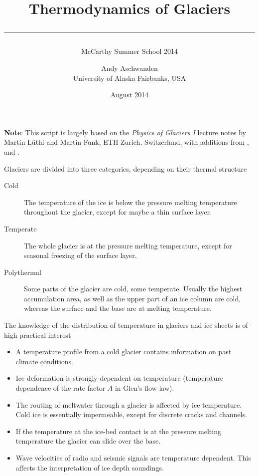\documentclass[parskip=half]{scrartcl}
\begin{document}
\title{Thermodynamics of Glaciers\\[.5em]
\rule[1.em]{\textwidth}{2pt}}
\subtitle{McCarthy Summer School 2014}

\date{August 2014}

\author{
  \small Andy Aschwanden\\[-.5em] 
 \small University of Alaska Fairbanks, USA}


\maketitle

{\bf Note}: This script is largely based on the \emph{Physics of
Glaciers I} lecture notes by Martin L\"uthi and Martin Funk, ETH
Zurich, Switzerland, with additions from \cite{GreveBlatter_disg},
\cite{Gusmeroli2010} and \cite{Aschwanden2012}.

\vspace{1em}

Glaciers are divided into three categories, depending on their thermal
structure
%
\begin{description}
\item[Cold] The temperature of the ice is below the pressure melting
temperature throughout the glacier, except for maybe a thin surface
layer.
\item[Temperate] The whole glacier is at the pressure melting
temperature, except for seasonal freezing of the surface layer.
\item[Polythermal] Some parts of the glacier are cold, some temperate.
Usually the highest accumulation area, as well as the upper part of an
ice column are cold, whereas the surface and the base are at melting
temperature.
\end{description}
%
The knowledge of the distribution of temperature in glaciers and ice
sheets is of high practical interest
%
\begin{itemize}\itemsep0ex
\item A temperature profile from a cold glacier contains information
on past climate conditions.
\item Ice deformation is strongly dependent on temperature
(temperature dependence of the rate factor $A$ in Glen's flow law).
\item The routing of meltwater through a glacier is affected by ice
temperature.  Cold ice is essentially impermeable, except for discrete
cracks and channels.
\item If the temperature at the ice-bed contact is at the pressure
melting temperature the glacier can slide over the base.
\item Wave velocities of radio and seismic signals are temperature
dependent. This affects the interpretation of ice depth soundings.
\end{itemize}
\end{document}
